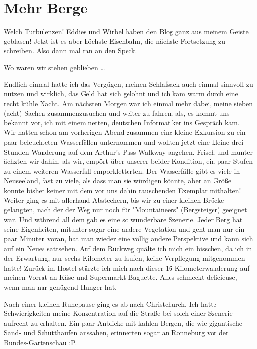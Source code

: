 \chapter{Mehr Berge}

Welch Turbulenzen! Eddies und Wirbel haben den Blog ganz aus meinem
Geiste geblasen! Jetzt ist es aber höchste Eisenbahn, die nächste
Fortsetzung zu schreiben. Also dann mal ran an den Speck.

Wo waren wir stehen geblieben \ldots{}

Endlich einmal hatte ich das Vergügen, meinen Schlafsack auch einmal
sinnvoll zu nutzen und wirklich, das Geld hat sich gelohnt und ich kam
warm durch eine recht kühle Nacht. Am nächsten Morgen war ich einmal
mehr dabei, meine sieben (acht) Sachen zusammenzusuchen und weiter zu
fahren, als, es kommt uns bekannt vor, ich mit einem netten, deutschen
Informatiker ins Gespräch kam. Wir hatten schon am vorherigen Abend
zusammen eine kleine Exkursion zu ein paar beleuchteten Wasserfällen
unternommen und wollten jetzt eine kleine drei-Stunden-Wanderung auf dem
Arthur's Pass Walkway angehen. Frisch und munter ächzten wir dahin, als
wir, empört über unserer beider Kondition, ein paar Stufen zu einem
weiteren Wasserfall emporkletterten. Der Wasserfälle gibt es viele in
Neuseeland, fast zu viele, als dass man sie würdigen könnte, aber an
Größe konnte bisher keiner mit dem vor uns dahin rauschenden Exemplar
mithalten! Weiter ging es mit allerhand Abstechern, bis wir zu einer
kleinen Brücke gelangten, nach der der Weg nur noch für "Mountaineers"
(Bergsteiger) geeignet war. Und während all dem gab es eine so
wunderbare Szenerie. Jeder Berg hat seine Eigenheiten, mitunter sogar
eine andere Vegetation und geht man nur ein paar Minuten voran, hat man
wieder eine völlig andere Perspektive und kann sich auf ein Neues
sattsehen. Auf dem Rückweg quälte ich mich ein bisschen, da ich in der
Erwartung, nur sechs Kilometer zu laufen, keine Verpflegung mitgenommen
hatte! Zurück im Hostel stürzte ich mich nach dieser 16
Kilometerwanderung auf meinen Vorrat an Käse und Supermarkt-Baguette.
Alles schmeckt delicieuse, wenn man nur genügend Hunger hat.

Nach einer kleinen Ruhepause ging es ab nach Christchurch. Ich hatte
Schwierigkeiten meine Konzentration auf die Straße bei solch einer
Szenerie aufrecht zu erhalten. Ein paar Anblicke mit kahlen Bergen, die
wie gigantische Sand- und Schutthaufen aussahen, erinnerten sogar an
Ronneburg vor der Bundes-Gartenschau :P.

